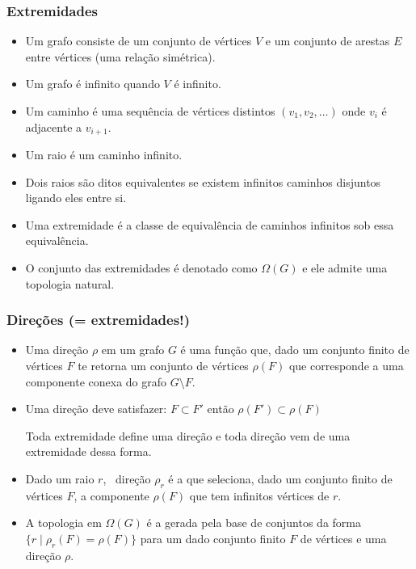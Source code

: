 \begin{frame}{}
\frametitle{Extremidades}
    \begin{itemize}
        \item Um grafo consiste de um conjunto de vértices $V$ e um conjunto de arestas $E$ entre vértices (uma relação simétrica). \pause
        \item Um grafo é infinito quando $V$ é infinito. \pause
        \item Um caminho é uma sequência de vértices distintos $(v_1, v_2, \dots)$ onde $v_i$ é adjacente a $v_{i+1}$. \pause
        \item Um raio é um caminho infinito. \pause
        \item Dois raios são ditos equivalentes se existem infinitos caminhos disjuntos ligando eles entre si. \pause
        \item Uma extremidade é a classe de equivalência de caminhos infinitos sob essa equivalência.
        \item O conjunto das extremidades é denotado como $\Omega(G)$ e ele admite uma topologia natural.
    \end{itemize}
\end{frame}
\begin{frame}{}
\frametitle{Direções (= extremidades!)}
    \begin{itemize}
        \item Uma direção $\rho$ em um grafo $G$ é uma função que, dado um conjunto finito de vértices $F$ te retorna um conjunto de vértices $\rho(F)$ que corresponde a uma componente conexa do grafo $G \setminus F$. \pause
        \item Uma direção deve satisfazer:  $F \subset F'$ então $\rho(F') \subset \rho(F)$ \pause
        
        \begin{theorem}
        Toda extremidade define uma direção e toda direção vem de uma extremidade dessa forma.
         \end{theorem}
         \pause
         \newline
        \item Dado um raio $r$, \ direção $\rho_r$ é a que seleciona, dado um conjunto finito de vértices $F$, a componente $\rho(F)$ que tem infinitos vértices de $r$.\pause
        \item A topologia em $\Omega(G)$ é a gerada pela base de conjuntos da forma $\{r \mid \rho_r(F) = \rho(F)\}$ para um dado conjunto finito $F$ de vértices e uma direção $\rho$.

        \end{itemize}
\end{frame}

